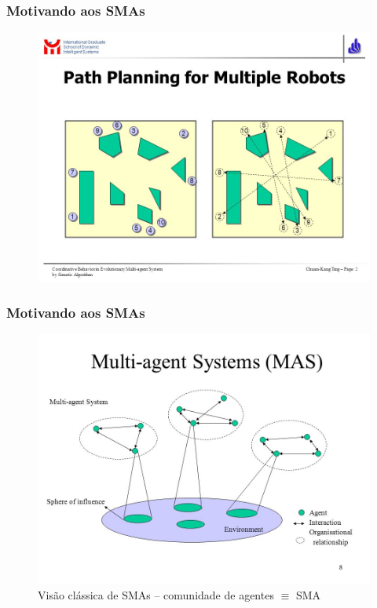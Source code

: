 
\begin{frame}
\frametitle{Motivando aos SMAs}

\begin{figure}[!ht]
\centering
\includegraphics[height =.6\textheight,width=.7\textwidth]{figuras/agentes_vizinhos02.jpeg}
\end{figure}
\end{frame}


\begin{frame}

  \frametitle{Motivando aos SMAs}

\begin{figure}[!ht]
\centering
\includegraphics[height =.7\textheight,width=.8\textwidth]{figuras/agentes_vizinhos03.jpeg}
\caption{Visão clássica de SMAs -- comunidade de agentes $\equiv $ SMA}
\end{figure}
 
\end{frame}


